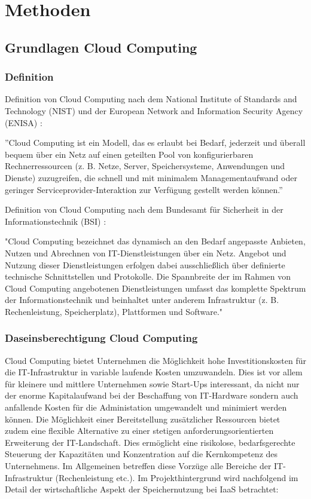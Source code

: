 \documentclass[12pt,a4paper,bibliography=totocnumbered,listof=totocnumbered]{scrartcl}
\begin{document}
\section{Methoden}
\subsection{Grundlagen Cloud Computing}
\subsubsection{Definition}
Definition von Cloud Computing nach dem National Institute of Standards and Technology (NIST) und der European Network and Information Security Agency (ENISA) \cite{34}:

''Cloud Computing ist ein Modell, das es erlaubt bei Bedarf, jederzeit und überall bequem über ein Netz auf einen geteilten Pool von konfigurierbaren Rechnerressourcen (z. B. Netze, Server, Speichersysteme, Anwendungen und Dienste) zuzugreifen, die schnell und mit minimalem Managementaufwand oder geringer Serviceprovider-Interaktion zur Verfügung gestellt werden können.''

Definition von Cloud Computing nach dem Bundesamt für Sicherheit in der Informationstechnik (BSI) \cite{35}:

"Cloud Computing bezeichnet das dynamisch an den Bedarf angepasste Anbieten, Nutzen und Abrechnen von IT-Dienstleistungen über ein Netz. Angebot und Nutzung dieser Dienstleistungen erfolgen dabei ausschließlich über definierte technische Schnittstellen und Protokolle. Die Spannbreite der im Rahmen von Cloud Computing angebotenen Dienstleistungen umfasst das komplette Spektrum der Informationstechnik und beinhaltet unter anderem Infrastruktur (z. B. Rechenleistung, Speicherplatz), Plattformen und Software."

\subsubsection{Daseinsberechtigung Cloud Computing}\label{CloudV}
Cloud Computing bietet Unternehmen die Möglichkeit hohe Investitionskosten für die IT-Infrastruktur in variable laufende Kosten umzuwandeln. Dies ist vor allem für kleinere und mittlere Unternehmen sowie Start-Ups interessant, da nicht nur der enorme Kapitalaufwand bei der Beschaffung von IT-Hardware sondern auch anfallende Kosten für die Administation umgewandelt und minimiert werden können. Die Möglichkeit einer Bereitstellung zusätzlicher Ressourcen bietet zudem eine flexible Alternative zu einer stetigen anforderungsorientierten Erweiterung der IT-Landschaft. Dies ermöglicht eine risikolose, bedarfsgerechte Steuerung der Kapazitäten und Konzentration auf die Kernkompetenz des Unternehmens. Im Allgemeinen betreffen diese Vorzüge alle Bereiche der IT-Infrastruktur (Rechenleistung etc.). Im Projekthintergrund wird nachfolgend im Detail der wirtschaftliche Aspekt der Speichernutzung bei IaaS betrachtet:
\end{document}
